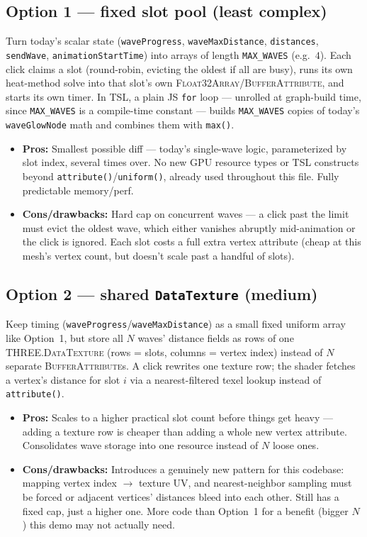 \documentclass[11pt]{article}
\newcommand{\code}[1]{\texttt{#1}}
\newcommand{\type}[1]{\textsc{#1}}
\begin{document}
\subsection*{Option 1 --- fixed slot pool (least complex)}
Turn today's scalar state (\code{waveProgress}, \code{waveMaxDistance}, \code{distances},
\code{sendWave}, \code{animationStartTime}) into arrays of length \code{MAX\_WAVES} (e.g.\
$4$). Each click claims a slot (round-robin, evicting the oldest if all are busy), runs its
own heat-method solve into that slot's own \type{Float32Array}/\type{BufferAttribute}, and
starts its own timer. In TSL, a plain JS \code{for} loop --- unrolled at graph-build time,
since \code{MAX\_WAVES} is a compile-time constant --- builds \code{MAX\_WAVES} copies of
today's \code{waveGlowNode} math and combines them with \code{max()}.
\begin{itemize}[leftmargin=1.4em]
  \item \textbf{Pros:} Smallest possible diff --- today's single-wave logic, parameterized
    by slot index, several times over. No new GPU resource types or TSL constructs beyond
    \code{attribute()}/\code{uniform()}, already used throughout this file. Fully
    predictable memory/perf.
  \item \textbf{Cons/drawbacks:} Hard cap on concurrent waves --- a click past the limit
    must evict the oldest wave, which either vanishes abruptly mid-animation or the click
    is ignored. Each slot costs a full extra vertex attribute (cheap at this mesh's vertex
    count, but doesn't scale past a handful of slots).
\end{itemize}

\subsection*{Option 2 --- shared \code{DataTexture} (medium)}
Keep timing (\code{waveProgress}/\code{waveMaxDistance}) as a small fixed uniform array
like Option~1, but store all $N$ waves' distance fields as rows of one
\type{THREE.DataTexture} (rows = slots, columns = vertex index) instead of $N$ separate
\type{BufferAttribute}s. A click rewrites one texture row; the shader fetches a vertex's
distance for slot $i$ via a nearest-filtered texel lookup instead of \code{attribute()}.
\begin{itemize}[leftmargin=1.4em]
  \item \textbf{Pros:} Scales to a higher practical slot count before things get heavy ---
    adding a texture row is cheaper than adding a whole new vertex attribute. Consolidates
    wave storage into one resource instead of $N$ loose ones.
  \item \textbf{Cons/drawbacks:} Introduces a genuinely new pattern for this codebase:
    mapping vertex index $\to$ texture UV, and nearest-neighbor sampling must be forced or
    adjacent vertices' distances bleed into each other. Still has a fixed cap, just a
    higher one. More code than Option~1 for a benefit (bigger $N$) this demo may not
    actually need.
\end{itemize}
\end{document}
